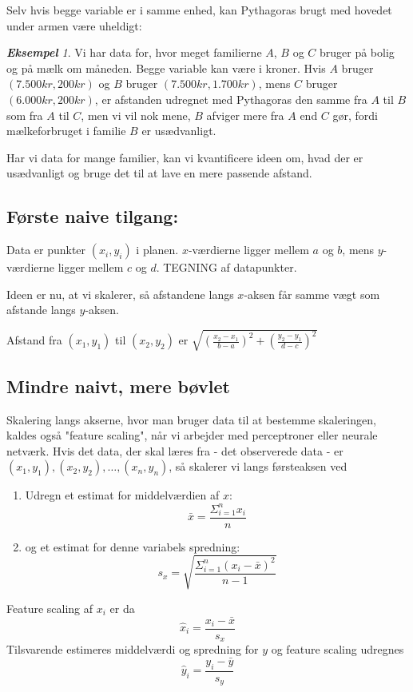 \documentclass[a4paper, 12pt]{article}
\theoremstyle{remark}
\newtheorem{Eksempel}{\textbf{Eksempel}}
\begin{document}
Selv hvis begge variable er i samme enhed, kan Pythagoras brugt med hovedet under armen være uheldigt:
\begin{Eksempel}
Vi har data for, hvor meget familierne $A$, $B$ og $C$  bruger på bolig og på mælk om måneden. Begge variable kan være i kroner. Hvis $A$ bruger $(7.500 kr, 200 kr)$ og $B$ bruger $(7.500 kr, 1.700 kr)$, mens $C$ bruger $(6.000 kr, 200 kr)$, er afstanden udregnet med Pythagoras den samme fra $A$ til $B$ som fra $A$ til $C$, men vi vil nok mene, $B$ afviger mere fra $A$ end $C$ gør, fordi mælkeforbruget i familie $B$ er usædvanligt.

Har vi data for mange familier, kan vi kvantificere ideen om, hvad der er usædvanligt og bruge det til at lave en mere passende afstand. 
\end{Eksempel}

\subsection*{Første naive tilgang:}

Data er punkter $(x_i,y_i)$ i planen. $x$-værdierne ligger mellem $a$ og $b$, mens $y$-værdierne ligger mellem $c$ og $d$. TEGNING af datapunkter.

Ideen er nu, at vi skalerer, så afstandene langs $x$-aksen får samme vægt som afstande langs $y$-aksen. 

Afstand fra $(x_1,y_1)$ til $(x_2,y_2)$ er $\sqrt{(\frac{x_2-x_1}{b-a})^2+(\frac{y_2-y_1}{d-c})^2}$
\subsection*{Mindre naivt, mere bøvlet}
Skalering langs akserne, hvor man bruger data til at bestemme skaleringen, kaldes også "feature scaling", når vi arbejder med perceptroner eller neurale netværk. Hvis det data, der skal læres fra - det observerede data - er $(x_1,y_1), (x_2,y_2),\ldots, (x_n,y_n)$, så skalerer vi langs førsteaksen ved
\begin{enumerate}
\item Udregn et estimat for middelværdien af $x$:
$$\bar{x}=\frac{\Sigma_{i=1}^nx_i}{n}$$
\item og et estimat for denne variabels spredning:
$$s_x=\sqrt{\frac{\Sigma_{i=1}^n(x_i-\bar{x})^2}{n-1}}$$
\end{enumerate}
Feature scaling af $x_i$ er da
$$\hat{x}_i=\frac{x_i-\bar{x}}{s_x}$$
Tilsvarende estimeres middelværdi og spredning for $y$ og feature scaling udregnes 
$$\hat{y}_i= \frac{y_i-\bar{y}}{s_y}$$
\end{document}
